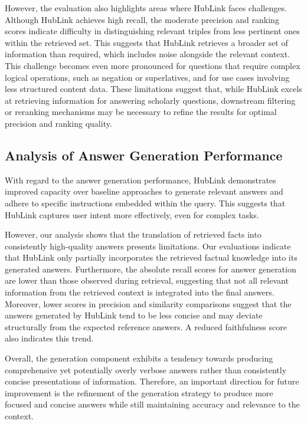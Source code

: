 However, the evaluation also highlights areas where HubLink faces challenges. Although HubLink achieves high recall, the moderate precision and ranking scores indicate difficulty in distinguishing relevant triples from less pertinent ones within the retrieved set. This suggests that HubLink retrieves a broader set of information than required, which includes noise alongside the relevant context. This challenge becomes even more pronounced for questions that require complex logical operations, such as negation or superlatives, and for use cases involving less structured content data. These limitations suggest that, while HubLink excels at retrieving information for answering scholarly questions, downstream filtering or reranking mechanisms may be necessary to refine the results for optimal precision and ranking quality.

\subsection{Analysis of Answer Generation Performance}

With regard to the answer generation performance, HubLink demonstrates improved capacity over baseline approaches to generate relevant answers and adhere to specific instructions embedded within the query. This suggests that HubLink captures user intent more effectively, even for complex tasks. 

However, our analysis shows that the translation of retrieved facts into consistently high-quality answers presents limitations. Our evaluations indicate that HubLink only partially incorporates the retrieved factual knowledge into its generated answers. Furthermore, the absolute recall scores for answer generation are lower than those observed during retrieval, suggesting that not all relevant information from the retrieved context is integrated into the final answers. Moreover, lower scores in precision and similarity comparisons suggest that the answers generated by HubLink tend to be less concise and may deviate structurally from the expected reference answers. A reduced faithfulness score also indicates this trend. 

Overall, the generation component exhibits a tendency towards producing comprehensive yet potentially overly verbose answers rather than consistently concise presentations of information. Therefore, an important direction for future improvement is the refinement of the generation strategy to produce more focused and concise answers while still maintaining accuracy and relevance to the context.

